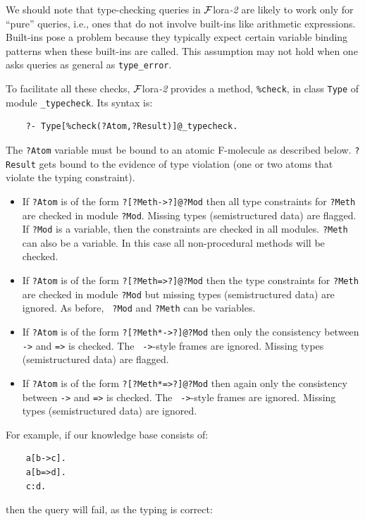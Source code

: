 \documentclass[11pt]{article}
\newcommand{\FLORA}{{\mbox{\sc ${\cal F}${lora}\rm\emph{-2}}}\xspace}
\begin{document}
We should note that type-checking queries in \FLORA are likely to work only
for ``pure'' queries, i.e., ones that do not involve built-ins like
arithmetic expressions. Built-ins pose a problem because they typically
expect certain variable binding patterns when these built-ins are called.
This assumption may not hold when one asks queries as general as
{\tt type\_error}.

To facilitate all these checks, \FLORA provides a method, {\tt \%check},
in class {\tt Type} of module {\tt \_typecheck}.  Its syntax is:
\begin{verbatim}
    ?- Type[%check(?Atom,?Result)]@_typecheck.
\end{verbatim}
The {\tt ?Atom} variable must be bound to an atomic F-molecule as
described below. {\tt ?Result} gets bound to the evidence of type violation
(one or two atoms that violate the typing constraint).
\begin{itemize}
\item  If {\tt ?Atom} is of the form {\tt ?[?Meth->?]@?Mod} then all type
  constraints for {\tt ?Meth} are checked in module {\tt ?Mod}. Missing
  types (semistructured data) are flagged. If {\tt ?Mod} is a variable,
  then the constraints are checked in all modules.  {\tt ?Meth} can also be
  a variable. In this case all non-procedural methods will be checked.
\item If {\tt ?Atom} is of the form {\tt ?[?Meth=>?]@?Mod} then the type
  constraints for {\tt ?Meth} are checked in module {\tt ?Mod} but
  missing types (semistructured data) are ignored. As before, {\tt
    ?Mod} and {\tt ?Meth} can be variables.
\item  If {\tt ?Atom} is of the form {\tt ?[?Meth*->?]@?Mod} then only the
  consistency between {\tt *->} and {\tt *=>} is checked. The {\tt
    ->}-style frames are ignored.   
  Missing types (semistructured data) are flagged.
\item If {\tt ?Atom} is of the form {\tt ?[?Meth*=>?]@?Mod} then again
  only the consistency between {\tt *->} and {\tt *=>} is checked. The {\tt
    ->}-style frames are ignored.  Missing types (semistructured data)
  are ignored.
\end{itemize}
For example, if our knowledge base consists of:
\begin{verbatim}
    a[b->c].
    a[b=>d].
    c:d.
\end{verbatim}
then the query will fail, as the typing is correct:
\end{document}
